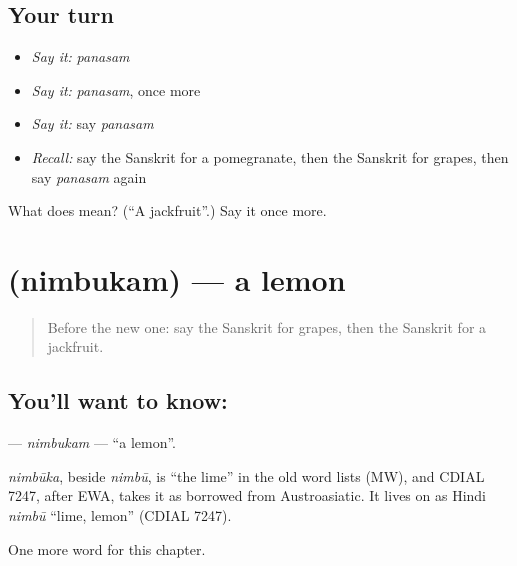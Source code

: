 \subsection*{Your turn}
\begin{itemize}
\raggedright
  \item \emph{Say it:} \emph{panasam}
  \item \emph{Say it:} \emph{panasam}, once more
  \item \emph{Say it:} say \emph{panasam}
  \item \emph{Recall:} say the Sanskrit for a pomegranate, then the Sanskrit for grapes, then say \emph{panasam} again
\end{itemize}

\begin{tcolorbox}[breakable,colback=teal!4,colframe=teal!35!black,title={Before you move on}]
What does  mean? (\textquotedblleft{}A jackfruit\textquotedblright{}.) Say it once more.
\end{tcolorbox}
\section[\texorpdfstring{\sk{निम्बुकम्} (nimbukam)}{निम्बुकम् (nimbukam)}]{ (nimbukam) — a lemon}

\label{lesson:SA-C109-nimbukam}



\begin{quote}
Before the new one: say the Sanskrit for grapes, then the Sanskrit for a jackfruit.
\end{quote}

\subsection*{You'll want to know: }
\textbf{} — \emph{nimbukam} — \textquotedblleft{}a lemon\textquotedblright{}.

\begin{cousinweb}
\emph{nimbūka}, beside \emph{nimbū}, is \textquotedblleft{}the lime\textquotedblright{} in the old word lists (MW), and CDIAL 7247, after EWA, takes it as borrowed from Austroasiatic. It lives on as Hindi \emph{nimbū} \textquotedblleft{}lime, lemon\textquotedblright{} (CDIAL 7247).
\end{cousinweb}

\begin{grammarlens}[title={What you've built}]
One more word for this chapter.
\end{grammarlens}

